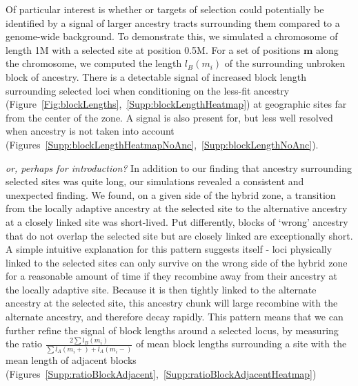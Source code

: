 \documentclass[12pt]{article}
\newcommand{\plr}[1]{{\em \color{blue} #1}}
\begin{document}
Of particular interest is whether or targets of selection could potentially be identified by a signal of larger ancestry tracts surrounding them compared to a genome-wide background. To demonstrate this, we simulated a chromosome of length 1M with a selected site at position 0.5M. For a set of positions $\mathbf{m}$ along the chromosome, we computed the length $l_B(m_i)$
of the surrounding unbroken block of ancestry. There is a detectable signal of increased block length surrounding selected loci when conditioning on the less-fit ancestry (Figure~\ref{Fig:blockLengths},~\ref{Supp:blockLengthHeatmap}) at geographic sites far from the center of the zone. A signal is also present for, but less well resolved when ancestry is not taken into account (Figures~\ref{Supp:blockLengthHeatmapNoAnc},~\ref{Supp:blockLengthNoAnc}).

\plr{or, perhaps for introduction?}
In addition to our finding that ancestry surrounding selected sites was quite long, our simulations revealed a consistent and unexpected finding. We found, on a given side of the hybrid zone, a transition from the locally adaptive ancestry at the selected site to the alternative ancestry at a closely linked site was short-lived. Put differently, blocks of `wrong' ancestry that do not overlap the selected site but are closely linked are exceptionally short. A simple intuitive explanation for this pattern suggests itself - loci physically linked to the selected sites can only survive on the wrong side of the hybrid zone for a reasonable amount of time if they recombine away from their ancestry at the locally adaptive site. Because it is then tightly linked to the alternate ancestry at the selected site, this ancestry chunk will large recombine with the alternate ancestry, and therefore decay rapidly. This pattern means that we can further refine the signal of block lengths around a selected locus, by measuring the ratio $\frac{2\sum{l_B(m_i)}}{\sum{l_A(m_i+)+l_A(m_i-)}}$ of mean block lengths surrounding a site with the mean length of adjacent blocks (Figures~\ref{Supp:ratioBlockAdjacent},~\ref{Supp:ratioBlockAdjacentHeatmap})
\end{document}
